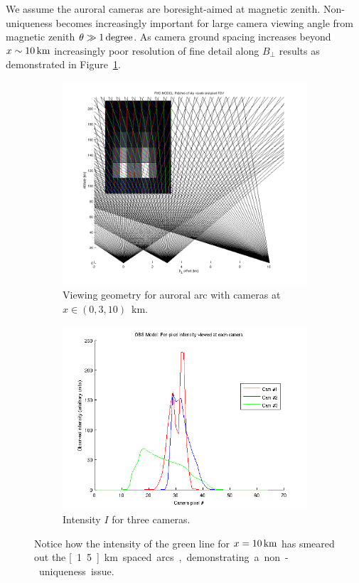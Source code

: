 We assume the auroral cameras are boresight-aimed at magnetic zenith. 
Non-uniqueness becomes increasingly important for large camera viewing angle from magnetic zenith $\theta \gg \unit[1]{degree}$.
As camera ground spacing increases beyond $x \sim \unit[10]{km}$ increasingly poor resolution of fine detail along $B_\perp$ results as demonstrated in Figure~\ref{fig:camres}.
\begin{figure}
	\begin{subfigure}[t]{0.45\linewidth}\centering
		\includegraphics[width=\columnwidth]{../gfx/L3cam}
		\caption{Viewing geometry for auroral arc with cameras at $x \in (0,3,10)$~km.}
	\end{subfigure}
	\begin{subfigure}[t]{0.45\linewidth}\centering
		\includegraphics[width=\columnwidth]{../gfx/I3cam}
		\caption{Intensity $I$ for three cameras.}
	\end{subfigure}
	\caption{Notice how the intensity of the green line for $x=\unit[10]{km}$ has smeared out the \unit[1.5]{km} spaced arcs, demonstrating a non-uniqueness issue.}
	\label{fig:camres}
\end{figure}
